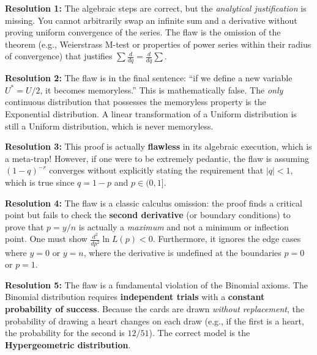 \documentclass[11pt, letterpaper]{article}
\theoremstyle{definition}
\theoremstyle{remark}
\begin{document}
\textbf{Resolution 1:} The algebraic steps are correct, but the \textit{analytical justification} is missing. You cannot arbitrarily swap an infinite sum and a derivative without proving uniform convergence of the series. The flaw is the omission of the theorem (e.g., Weierstrass M-test or properties of power series within their radius of convergence) that justifies $\sum \frac{d}{dq} = \frac{d}{dq} \sum$.

\textbf{Resolution 2:} The flaw is in the final sentence: ``if we define a new variable $U^* = U/2$, it becomes memoryless.'' This is mathematically false. The \textit{only} continuous distribution that possesses the memoryless property is the Exponential distribution. A linear transformation of a Uniform distribution is still a Uniform distribution, which is never memoryless.

\textbf{Resolution 3:} This proof is actually \textbf{flawless} in its algebraic execution, which is a meta-trap! However, if one were to be extremely pedantic, the flaw is assuming $(1-q)^{-r}$ converges without explicitly stating the requirement that $|q| < 1$, which is true since $q = 1-p$ and $p \in (0,1]$.

\textbf{Resolution 4:} The flaw is a classic calculus omission: the proof finds a critical point but fails to check the \textbf{second derivative} (or boundary conditions) to prove that $p = y/n$ is actually a \textit{maximum} and not a minimum or inflection point. One must show $\frac{d^2}{dp^2} \ln L(p) < 0$. Furthermore, it ignores the edge cases where $y=0$ or $y=n$, where the derivative is undefined at the boundaries $p=0$ or $p=1$.

\textbf{Resolution 5:} The flaw is a fundamental violation of the Binomial axioms. The Binomial distribution requires \textbf{independent trials} with a \textbf{constant probability of success}. Because the cards are drawn \textit{without replacement}, the probability of drawing a heart changes on each draw (e.g., if the first is a heart, the probability for the second is $12/51$). The correct model is the \textbf{Hypergeometric distribution}.
\end{document}
